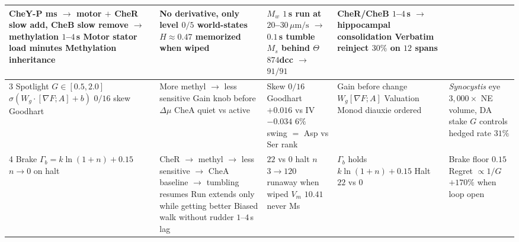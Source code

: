 \documentclass[12pt,a4paper]{article}
\begin{document}
\begin{table}[H]
\begin{tabular}{p{2.6cm} p{3.0cm} p{2.6cm} p{2.6cm} p{2.6cm}}
CheY-P ms $\to$ motor $+$ CheR slow add, CheB slow remove $\to$ methylation $1$--$4$\,s \newline Motor stator load minutes \newline Methylation inheritance &
No derivative, only level \newline $0/5$ world-states \newline $H{\approx}0.47$ memorized when wiped &
$M_w$ $1$\,s run at $20$--$30\,\mu\mathrm{m/s}$ $\to$ $0.1$\,s tumble \newline $M_s$ behind $\Theta$ \newline $874$dcc $\to$ $91/91$ &
CheR/CheB $1$--$4$\,s $\to$ hippocampal consolidation \newline Verbatim reinject $30\%$ on $12$ spans \\
\midrule
3 Spotlight \newline $G \in [0.5,2.0]$ \newline $\sigma(W_g{\cdot}[\nabla F;A]+b)$ \newline $0/16$ skew Goodhart &
More methyl $\to$ less sensitive \newline Gain knob before $\Delta\mu$ \newline CheA quiet vs active &
Skew $0/16$ Goodhart \newline $+0.016$ vs IV $-0.034$ \newline $6\%$ swing $=$ Asp vs Ser rank &
Gain before change \newline $W_g[\nabla F;A]$ \newline Valuation Monod diauxie ordered &
\emph{Synocystis} eye $3{,}000{\times}$ \newline NE volume, DA stake \newline $G$ controls hedged rate $31\%$ \\
\midrule
4 Brake \newline $\Gamma_b = k\ln(1{+}n)+0.15$ \newline $n\to 0$ on halt &
CheR $\to$ methyl $\to$ less sensitive $\to$ CheA baseline $\to$ tumbling resumes \newline Run extends only while getting better \newline Biased walk without rudder \newline $1$--$4$\,s lag &
$22$ vs $0$ halt \newline $n$ $3{\to}120$ runaway when wiped \newline $V_m$ $10.41$ never Ms &
$\Gamma_b$ holds $k\ln(1{+}n)+0.15$ \newline Halt $22$ vs $0$ &
Brake floor $0.15$ \newline Regret $\propto 1/G$ \newline $+170\%$ when loop open \\

\end{tabular}
\end{table}
\end{document}

